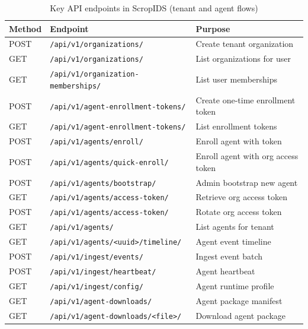 \documentclass[conference]{IEEEtran}
\begin{document}
\begin{table}[!t]
\centering
\caption{Key API endpoints in ScropIDS (tenant and agent flows)}
\label{tab:api}
\small
\begin{tabularx}{\columnwidth}{l l X}
\toprule
\textbf{Method} & \textbf{Endpoint} & \textbf{Purpose} \\
\midrule
POST & \texttt{/api/v1/organizations/} & Create tenant organization \\
GET & \texttt{/api/v1/organizations/} & List organizations for user \\
GET & \texttt{/api/v1/organization-memberships/} & List user memberships \\
POST & \texttt{/api/v1/agent-enrollment-tokens/} & Create one-time enrollment token \\
GET & \texttt{/api/v1/agent-enrollment-tokens/} & List enrollment tokens \\
POST & \texttt{/api/v1/agents/enroll/} & Enroll agent with token \\
POST & \texttt{/api/v1/agents/quick-enroll/} & Enroll agent with org access token \\
POST & \texttt{/api/v1/agents/bootstrap/} & Admin bootstrap new agent \\
GET & \texttt{/api/v1/agents/access-token/} & Retrieve org access token \\
POST & \texttt{/api/v1/agents/access-token/} & Rotate org access token \\
GET & \texttt{/api/v1/agents/} & List agents for tenant \\
GET & \texttt{/api/v1/agents/\textless uuid\textgreater/timeline/} & Agent event timeline \\
POST & \texttt{/api/v1/ingest/events/} & Ingest event batch \\
POST & \texttt{/api/v1/ingest/heartbeat/} & Agent heartbeat \\
GET & \texttt{/api/v1/ingest/config/} & Agent runtime profile \\
GET & \texttt{/api/v1/agent-downloads/} & Agent package manifest \\
GET & \texttt{/api/v1/agent-downloads/\textless file\textgreater/} & Download agent package \\
\bottomrule
\end{tabularx}
\end{table}
\end{document}
